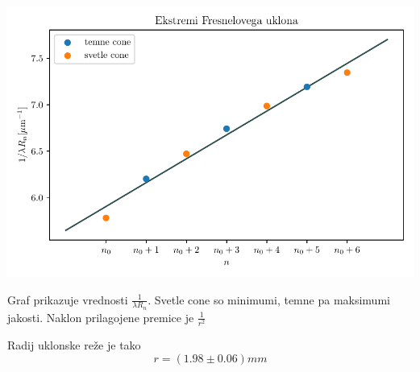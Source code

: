 \documentclass[12pt]{report}
\begin{document}
\begin{slika}[H]
  \centering
  \includegraphics{fresnel-zones}
  \caption{\small Graf prikazuje vrednosti $\frac{1}{\lambda R_n}$. Svetle cone so minimumi, temne pa maksimumi jakosti. Naklon prilagojene premice je $\frac{1}{r^2}$}
\end{slika}

Radij uklonske reže je tako 
\[
r = (1.98 \pm 0.06)\si{mm}  
\]
\end{document}
